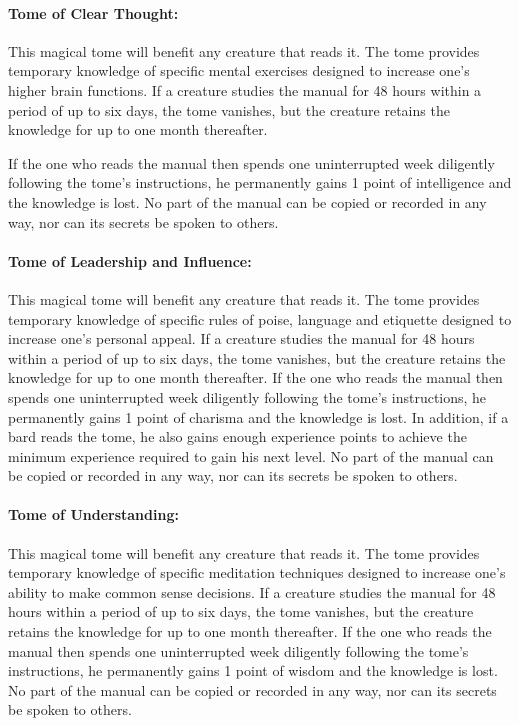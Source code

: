 \begin{multicols}{2}
\paragraph{Tome of Clear Thought:} This magical tome will benefit any creature that reads it.  The tome provides temporary knowledge of specific mental exercises designed to increase one's higher brain functions.  If a creature studies the manual for 48 hours within a period of up to six days, the tome vanishes, but the creature retains the knowledge for up to one month thereafter.  

If the one who reads the manual then spends one uninterrupted week diligently following the tome's instructions, he permanently gains 1 point of intelligence and the knowledge is lost.  No part of the manual can be copied or recorded in any way, nor can its secrets be spoken to others.

\paragraph{Tome of Leadership and Influence:} This magical tome will benefit any creature that reads it.  The tome provides temporary knowledge of specific rules of poise, language and etiquette designed to increase one's personal appeal.  If a creature studies the manual for 48 hours within a period of up to six days, the tome vanishes, but the creature retains the knowledge for up to one month thereafter.  If the one who reads the manual then spends one uninterrupted week diligently following the tome's instructions, he permanently gains 1 point of charisma and the knowledge is lost.  In addition, if a bard reads the tome, he also gains enough experience points to achieve the minimum experience required to gain his next level.  No part of the manual can be copied or recorded in any way, nor can its secrets be spoken to others.

\paragraph{Tome of Understanding:} This magical tome will benefit any creature that reads it.  The tome provides temporary knowledge of specific meditation techniques designed to increase one's ability to make common sense decisions.  If a creature studies the manual for 48 hours within a period of up to six days, the tome vanishes, but the creature retains the knowledge for up to one month thereafter.  If the one who reads the manual then spends one uninterrupted week diligently following the tome's instructions, he permanently gains 1 point of wisdom and the knowledge is lost.  No part of the manual can be copied or recorded in any way, nor can its secrets be spoken to others.


\end{multicols}
